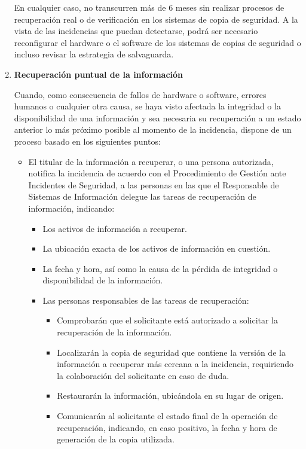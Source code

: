 \begin{enumerate}[label=\alph*)]
En cualquier caso, no transcurren más de 6 meses sin realizar procesos de recuperación real o de verificación en los sistemas de copia de seguridad. A la vista de las incidencias que puedan detectarse, podrá ser necesario reconfigurar el hardware o el software de los sistemas de copias de seguridad o incluso revisar la estrategia de salvaguarda.

\item \textbf{Recuperación puntual de la información}

Cuando, como consecuencia de fallos de hardware o software, errores humanos o cualquier otra causa, se haya visto afectada la integridad o la disponibilidad de una información y sea necesaria su recuperación a un estado anterior lo más próximo posible al momento de la incidencia, \Beneficiario{} dispone de un proceso basado en los siguientes puntos:

\begin{itemize}
    \item El titular de la información a recuperar, o una persona autorizada, notifica la incidencia de acuerdo con el Procedimiento de Gestión ante Incidentes de Seguridad, a las personas en las que el Responsable de Sistemas de Información delegue las tareas de recuperación de información, indicando:
    \begin{itemize}
        \item Los activos de información a recuperar.
        \item La ubicación exacta de los activos de información en cuestión.
        \item La fecha y hora, así como la causa de la pérdida de integridad o disponibilidad de la información.
        \item Las personas responsables de las tareas de recuperación:
        \begin{itemize}
            \item Comprobarán que el solicitante está autorizado a solicitar la recuperación de la información.
            \item Localizarán la copia de seguridad que contiene la versión de la información a recuperar más cercana a la incidencia, requiriendo la colaboración del solicitante en caso de duda.
            \item Restaurarán la información, ubicándola en su lugar de origen.
            \item Comunicarán al solicitante el estado final de la operación de recuperación, indicando, en caso positivo, la fecha y hora de generación de la copia utilizada.
        \end{itemize}
    \end{itemize}
\end{itemize}


\end{enumerate}
